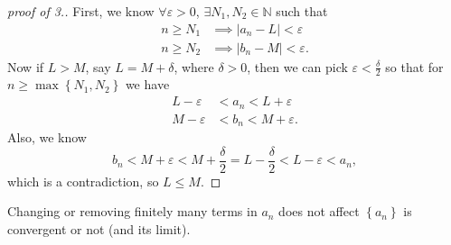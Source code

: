 \begin{proof}[proof of 3.]
	First, we know \(\forall \varepsilon > 0\), \(\exists N_1, N_2 \in \mathbb{N} \) such that   
	\begin{align*}
		n \geq N_1 &\implies \left\vert a_n - L \right\vert < \varepsilon \\
		n \geq N_2 &\implies \left\vert b_n - M \right\vert < \varepsilon. 
	\end{align*}
	Now if \(L > M\), say \(L = M + \delta \), where \(\delta > 0\), then we can pick \(\varepsilon < \frac{\delta}{2}\) so that for \(n \ge \max \left\{ N_1, N_2 \right\} \) we have 
	\begin{align*}
		L - \varepsilon &< a_n < L + \varepsilon \\
		M - \varepsilon &< b_n < M + \varepsilon. 
	\end{align*}    
	Also, we know
	\[
		b_n < M + \varepsilon < M + \frac{\delta}{2} = L - \frac{\delta}{2} < L - \varepsilon < a_n,
	\]
	which is a contradiction, so \(L \le M\). 
\end{proof}
\begin{remark}
	Changing or removing finitely many terms in \(a_n\) does not affect \(\left\{ a_n \right\} \) is convergent or not (and its limit).   
\end{remark}

